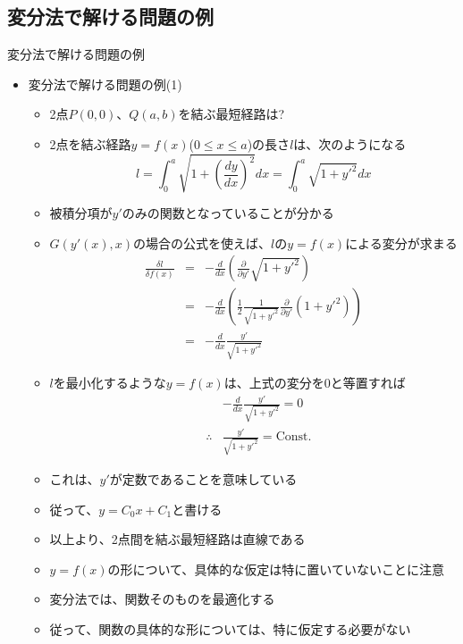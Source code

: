 \documentclass[dvipdfmx,notheorems,t]{beamer}
\begin{document}
\subsection{変分法で解ける問題の例}

\begin{frame}{変分法で解ける問題の例}

\begin{itemize}
	\item 変分法で解ける問題の例(1)
	\begin{itemize}
		\item 2点$P(0, 0)$、$Q(a, b)$を結ぶ最短経路は?
		\newline
		\item 2点を結ぶ経路$y = f(x)$($0 \le x \le a$)の長さ$l$は、次のようになる
		\begin{equation}
			l = \int_0^a \sqrt{1 + \left( \frac{dy}{dx} \right)^2} dx = \int_0^a \sqrt{1 + y'^2} dx
		\end{equation}
		
		\item 被積分項が$y'$のみの関数となっていることが分かる
		\item $G(y'(x), x)$の場合の公式を使えば、$l$の$y = f(x)$による変分が求まる
		\begin{eqnarray}
			\frac{\delta l}{\delta f(x)} &=& - \frac{d}{dx} \left( \frac{\partial}{\partial y'} \sqrt{1 + y'^2} \right) \\
			&=& - \frac{d}{dx} \left( \frac{1}{2} \frac{1}{\sqrt{1 + y'^2}} \frac{\partial}{\partial y'} \left( 1 + y'^2 \right) \right) \\
			&=& - \frac{d}{dx} \frac{y'}{\sqrt{1 + y'^2}}
		\end{eqnarray}
		
		\item $l$を最小化するような$y = f(x)$は、上式の変分を$0$と等置すれば
		\begin{eqnarray}
			&& - \frac{d}{dx} \frac{y'}{\sqrt{1 + y'^2}} = 0 \\
			&\therefore& \frac{y'}{\sqrt{1 + y'^2}} = \mathrm{Const.}
		\end{eqnarray}
		
		\item これは、\color{red}$y'$が定数である\normalcolor ことを意味している
		\item 従って、\color{red}$y = C_0 x + C_1$\normalcolor と書ける
		\newline
		\item 以上より、\color{red}2点間を結ぶ最短経路は直線\normalcolor である
		\newline
		\item $y = f(x)$の形について、\alert{具体的な仮定は特に置いていない}ことに注意
		\item 変分法では、\alert{関数そのものを最適化する}
		\item 従って、関数の具体的な形については、特に仮定する必要がない
	\end{itemize}
\end{itemize}

\end{frame}
\end{document}
